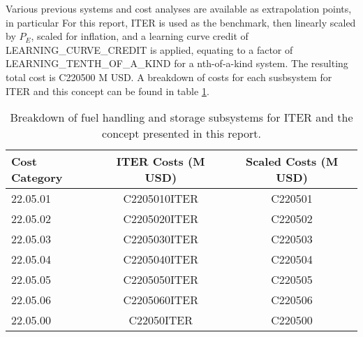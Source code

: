 Various previous systems and cost analyses are available as extrapolation points, in particular For this report, ITER is used as the benchmark, then linearly scaled by $P_E$, scaled for inflation, and a learning curve credit of LEARNING_CURVE_CREDIT is applied, equating to a factor of LEARNING_TENTH_OF_A_KIND for a nth-of-a-kind system.  The resulting total cost is C220500 M USD. A breakdown of costs for each susbsystem for ITER and this concept can be found in table \ref{tab:fuel}.



\begin{table}
    \centering
    \begin{tabular}{lcc}
    \hline
        Cost Category & ITER Costs (M USD) & Scaled Costs (M USD)\\
        \hline
       22.05.01  & C2205010ITER & C220501\\
       22.05.02  & C2205020ITER & C220502\\
       22.05.03  & C2205030ITER & C220503\\
       22.05.04  & C2205040ITER & C220504\\
       22.05.05  & C2205050ITER & C220505\\
       22.05.06  & C2205060ITER & C220506\\
       22.05.00  & C22050ITER   & C220500\\
       \hline
    \end{tabular}
    \caption{Breakdown of fuel handling and storage subsystems for ITER and the concept presented in this report.}
    \label{tab:fuel}
\end{table}
